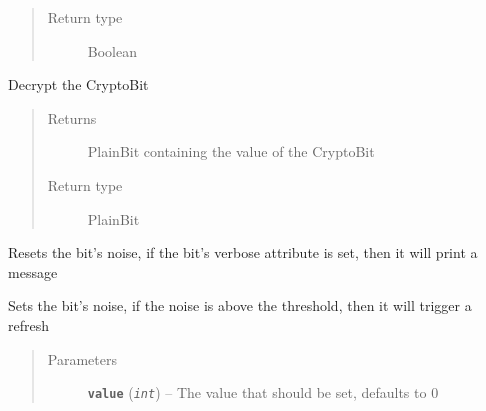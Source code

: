 \documentclass[letterpaper,10pt,english]{sphinxmanual}
\begin{document}
\begin{fulllineitems}
\begin{fulllineitems}
\begin{quote}
\begin{description}
\item[{Return type}] \leavevmode
Boolean

\end{description}\end{quote}

\end{fulllineitems}


\begin{fulllineitems}
\label{datatypes.bits:datatypes.bits.Bit.CryptoBit.decrypt}
Decrypt the CryptoBit
\begin{quote}\begin{description}
\item[{Returns}] \leavevmode
PlainBit containing the value of the CryptoBit

\item[{Return type}] \leavevmode
PlainBit

\end{description}\end{quote}

\end{fulllineitems}


\begin{fulllineitems}
\label{datatypes.bits:datatypes.bits.Bit.CryptoBit.refresh}
Resets the bit's noise, if the bit's verbose attribute is set, then it will print a message

\end{fulllineitems}


\begin{fulllineitems}
\label{datatypes.bits:datatypes.bits.Bit.CryptoBit.setNoise}
Sets the bit's noise, if the noise is above the threshold, then it will trigger a refresh
\begin{quote}\begin{description}
\item[{Parameters}] \leavevmode
\textbf{\texttt{value}} (\emph{\texttt{int}}) -- The value that should be set, defaults to 0

\end{description}\end{quote}

\end{fulllineitems}


\end{fulllineitems}
\end{document}
